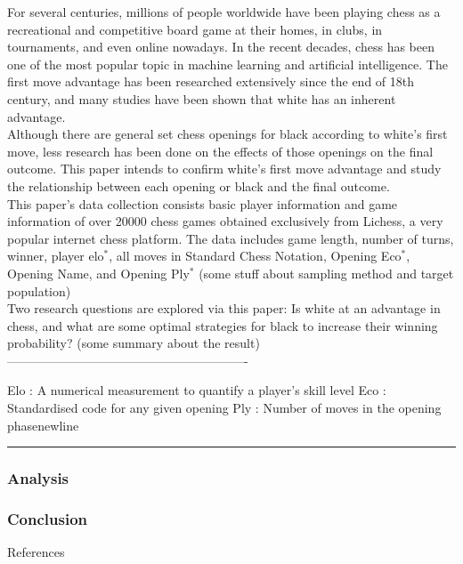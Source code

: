 \documentclass[11pt,]{article}
\begin{document}
For several centuries, millions of people worldwide have been playing
chess as a recreational and competitive board game at their homes, in
clubs, in tournaments, and even online nowadays. In the recent decades,
chess has been one of the most popular topic in machine learning and
artificial intelligence. The first move advantage has been researched
extensively since the end of 18th century, and many studies have been
shown that white has an inherent advantage.\\
\newline Although there are general set chess openings for black
according to white's first move, less research has been done on the
effects of those openings on the final outcome. This paper intends to
confirm white's first move advantage and study the relationship between
each opening or black and the final outcome.\\
\newline This paper's data collection consists basic player information
and game information of over 20000 chess games obtained exclusively from
Lichess, a very popular internet chess platform. The data includes game
length, number of turns, winner, player elo\(^*\), all moves in Standard
Chess Notation, Opening Eco\(^*\), Opening Name, and Opening Ply\(^*\)
(some stuff about sampling method and target population)\\
\newline Two research questions are explored via this paper: Is white at
an advantage in chess, and what are some optimal strategies for black to
increase their winning probability? (some summary about the result)\\
\newline ----------------------------------------------------------

\begin{flushleft}
Elo : A numerical measurement to quantify a player's skill level\newline
Eco : Standardised code for any given opening\newline
Ply : Number of moves in the opening phasenewline
\pagebreak
\end{flushleft}

\begin{center}\rule{0.5\linewidth}{0.5pt}\end{center}

\begin{flushleft}
\end{flushleft}

\hypertarget{analysis}{%
\subsubsection{Analysis}\label{analysis}}

\hypertarget{conclusion}{%
\subsubsection{Conclusion}\label{conclusion}}

\pagebreak
\begin{center}
\Large{References}
\end{center}





\newpage
\singlespacing 
\end{document}
